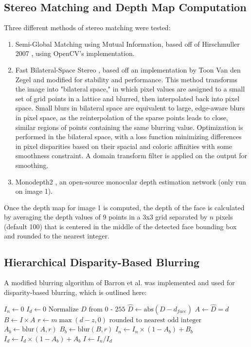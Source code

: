 \documentclass[10pt,twocolumn,letterpaper]{article}
\begin{document}
\subsection{Stereo Matching and Depth Map Computation}
Three different methods of stereo matching were tested:
\begin{enumerate}
    \item Semi-Global Matching using Mutual Information, based off of Hirschmuller 2007 \cite{hirschmuller_2007}, using OpenCV's implementation.
    \item Fast Bilateral-Space Stereo \cite{barron_adams_shih_hernandez_2015}, based off an implementation by Toon Van den Zegel \cite{fast_bilateral_stereo} and modified for stability and performance.
          This method transforms the image into "bilateral space," in which pixel values are assigned to a small set of grid points in a lattice and blurred, then interpolated back into pixel space.
          Small blurs in bilateral space are equivalent to large, edge-aware blurs in pixel space, as the reinterpolation of the sparse points leads to close, similar regions of points containing the
          same blurring value. Optimization is performed in the bilateral space, with a loss function minimizing differences in pixel disparities based on their spacial and coloric affinities with some
          smoothness constraint. A domain transform filter is applied on the output for smoothing.
    \item Monodepth2 \cite{monodepth2}, an open-source monocular depth estimation network (only run on image 1).
\end{enumerate}

Once the depth map for image 1 is computed, the depth of the face is calculated by averaging the depth values of 9 points in a 3x3 grid separated by $n$ pixels (default 100) that is centered in the middle of the detected face bounding box and rounded to the nearest integer.

\subsection{Hierarchical Disparity-Based Blurring}

A modified blurring algorithm of Barron et al. \cite{barron_adams_shih_hernandez_2015} was implemented and used for disparity-based blurring, which is outlined here:
\begin{algorithmic}
    \State $I_n \gets 0$
    \State $I_d \gets 0$
    \State $\text{Normalize } D \text{ from 0 - 255}$
    \State $\hat{D} \gets \text{abs}(D - d_{\textit{face}})$
        \State $A \gets  \hat{D} = d$
        \State $B \gets I \times A$
        \State $r \gets m \max{(d - z, 0)} \text{ rounded to nearest odd integer}$
        \State $A_b \gets \text{blur}(A, r)$
        \State $B_b \gets \text{blur}(B, r)$
        \State $I_n \gets I_n \times (1 - A_b) + B_b$
        \State $I_d \gets I_d \times (1 - A_b) + A_b$
    \EndFor
    \State $I \gets I_n / I_d$
\end{algorithmic}
\end{document}
